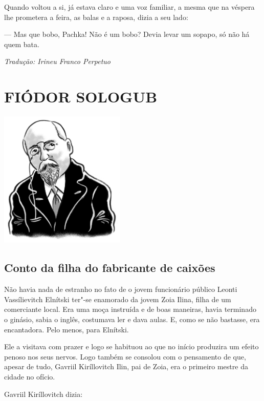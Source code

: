 Quando voltou a si, já estava claro e uma voz familiar, a mesma que na
véspera lhe prometera a feira, as balas e a raposa, dizia a seu lado:

--- Mas que bobo, Pachka! Não é um bobo? Devia levar um sopapo, só não
há quem bata.

\medskip

{\footnotesize\hfill\emph{Tradução: Irineu Franco Perpetuo}}


\part[FIÓDOR SOLOGUB]{FIÓDOR SOLOGUB }

\pagebreak
\thispagestyle{empty}
\mbox{}
\vfill
\begin{center}
\includegraphics[width=6cm]{./imgs/autor7.jpg}
\end{center}


\chapter{Conto da filha do fabricante de caixões} \label{part8}

Não havia nada de estranho no fato de o jovem funcionário público Leonti
Vassílievitch Elnítski ter"-se enamorado da jovem Zoia Ilina, filha de um
comerciante local. Era uma moça instruída e de boas maneiras, havia
terminado o ginásio, sabia o inglês, costumava ler e dava aulas. E, como
se não bastasse, era encantadora. Pelo menos, para Elnítski.

Ele a visitava com prazer e logo se habituou ao que no início produzira
um efeito penoso nos seus nervos. Logo também se consolou com o
pensamento de que, apesar de tudo, Gavriil Kiríllovitch Ilin, pai de
Zoia, era o primeiro mestre da cidade no ofício.

Gavriil Kiríllovitch dizia:

